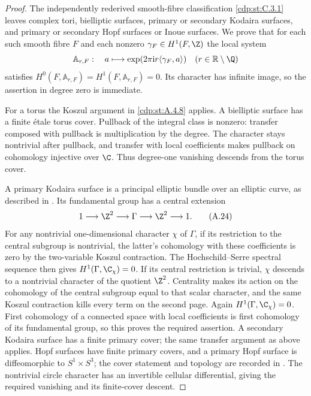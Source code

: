 \begin{proof}
The independently rederived smooth-fibre classification \ref{cdp:st:C.3.1} leaves complex tori, bielliptic surfaces, primary or secondary Kodaira surfaces, and primary or secondary Hopf surfaces or Inoue surfaces. We prove that for each such smooth fibre $F$ and each nonzero $\gamma_F\in H^1(F,\Z)$ the local system
\[
 \mathbb A_{r,F}:\quad a\longmapsto
       \exp(2\pi\mathrm i r\langle\gamma_F,a\rangle)
 \quad(r\in\mathbb R\setminus\Q)
\]
satisfies $H^0(F,\mathbb A_{r,F})=H^1(F,\mathbb A_{r,F})=0$. Its character has infinite image, so the assertion in degree zero is immediate.

For a torus the Koszul argument in \ref{cdp:st:A.4.8} applies. A bielliptic surface has a finite étale torus cover. Pullback of the integral class is nonzero: transfer composed with pullback is multiplication by the degree. The character stays nontrivial after pullback, and transfer with local coefficients makes pullback on cohomology injective over $\C$. Thus degree-one vanishing descends from the torus cover.

A primary Kodaira surface is a principal elliptic bundle over an elliptic curve, as described in \cite[\S1 and the central-extension diagram in the proof of Lemma~1.1]{SS2002}. Its fundamental group has a central extension
\[
 1\longrightarrow\Z^2\longrightarrow\Gamma\longrightarrow\Z^2
       \longrightarrow1.
 \tag{A.24}\label{cdp:eq:A.24}
\]
For any nontrivial one-dimensional character $\chi$ of $\Gamma$, if its restriction to the central subgroup is nontrivial, the latter's cohomology with these coefficients is zero by the two-variable Koszul contraction. The Hochschild--Serre spectral sequence then gives $H^1(\Gamma,\C_\chi)=0$. If its central restriction is trivial, $\chi$ descends to a nontrivial character of the quotient $\Z^2$. Centrality makes its action on the cohomology of the central subgroup equal to that scalar character, and the same Koszul contraction kills every term on the second page. Again $H^1(\Gamma,\C_\chi)=0$. First cohomology of a connected space with local coefficients is first cohomology of its fundamental group, so this proves the required assertion. A secondary Kodaira surface has a finite primary cover; the same transfer argument as above applies. Hopf surfaces have finite primary covers, and a primary Hopf surface is diffeomorphic to $S^1\times S^3$; the cover statement and topology are recorded in \cite[\S2.1.1 and Theorem~2.2]{Albanese2020}. The nontrivial circle character has an invertible cellular differential, giving the required vanishing and its finite-cover descent.


\end{proof}
